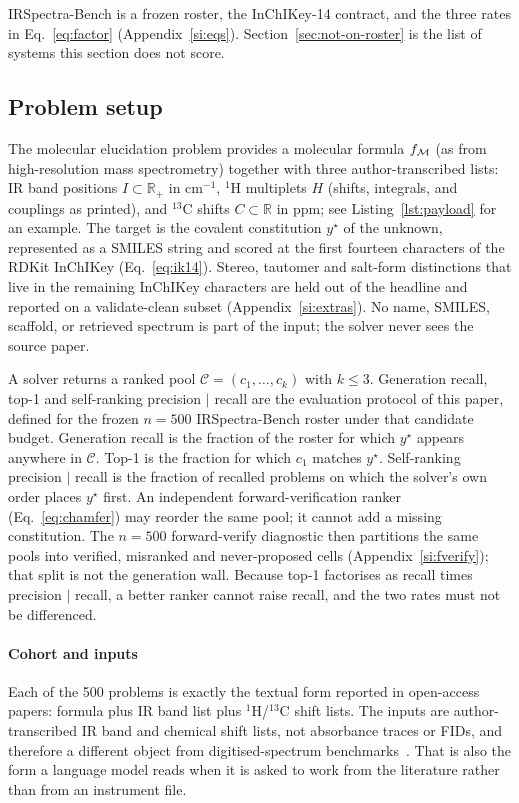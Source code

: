 \documentclass{article}
\begin{document}
IRSpectra-Bench is a frozen roster, the InChIKey-14 contract, and the
three rates in Eq.~\ref{eq:factor} (Appendix~\ref{si:eqs}).
Section~\ref{sec:not-on-roster} is the list of systems this section does not score.

\subsection{Problem setup}
\label{sec:preliminaries}
The molecular elucidation problem provides a molecular formula $f_{\cal M}$ (as from
high-resolution mass spectrometry) together with three author-transcribed
lists: IR band positions $I \subset \mathbb{R}_{+}$ in cm$^{-1}$,
$^1$H multiplets $H$ (shifts, integrals, and couplings as printed), and
$^{13}$C shifts $C \subset \mathbb{R}$ in ppm; see Listing~\ref{lst:payload} for an example.
The target is the covalent constitution $y^\star$ of the unknown,
represented as a SMILES string and scored at the first fourteen characters
of the RDKit InChIKey (Eq.~\ref{eq:ik14}).
Stereo, tautomer and salt-form distinctions that live in the remaining
InChIKey characters are held out of the headline and reported on a
validate-clean subset (Appendix~\ref{si:extras}).
No name, SMILES, scaffold, or retrieved spectrum is part of the input;
the solver never sees the source paper.

A solver returns a ranked pool $\mathcal{C}=(c_1,\ldots,c_k)$ with
$k\leq 3$.
Generation recall, top-1 and self-ranking precision $|$ recall are the
evaluation protocol of this paper, defined for the frozen $n{=}500$
IRSpectra-Bench roster under that candidate budget.
Generation recall is the fraction of the roster for which
$y^\star$ appears anywhere in $\mathcal{C}$.
Top-1 is the fraction for which $c_1$ matches $y^\star$.
Self-ranking precision $|$ recall is the fraction of recalled problems on
which the solver's own order places $y^\star$ first.
An independent forward-verification ranker (Eq.~\ref{eq:chamfer}) may
reorder the same pool; it cannot add a missing constitution.
The $n{=}500$ forward-verify diagnostic then partitions the same pools into
verified, misranked and never-proposed cells
(Appendix~\ref{si:fverify}); that split is not the generation wall.
Because top-1 factorises as recall times precision $|$ recall, a better
ranker cannot raise recall, and the two rates must not be differenced.

\paragraph{Cohort and inputs}
Each of the 500 problems is exactly the textual form reported in
open-access papers: formula plus IR band list plus $^1$H/$^{13}$C shift
lists.
The inputs are author-transcribed IR band and chemical shift lists, not
absorbance traces or FIDs, and therefore a different object from
digitised-spectrum benchmarks~\citep{espejo2026agentic}.
That is also the form a language model reads when it is asked to work
from the literature rather than from an instrument file.
\end{document}
